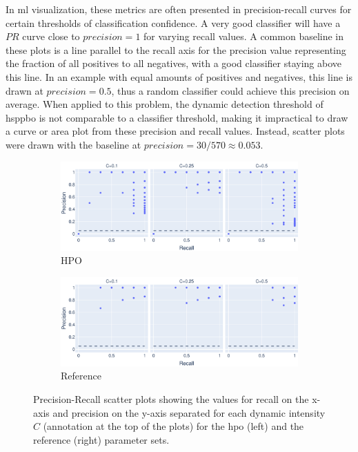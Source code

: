 In \gls{ml} visualization, these metrics are often presented in precision-recall curves for certain thresholds of classification confidence. A very good classifier will have a $PR$ curve close to $precision=1$ for varying recall values. A common baseline in these plots is a line parallel to the recall axis for the precision value representing the fraction of all positives to all negatives, with a good classifier staying above this line. In an example with equal amounts of positives and negatives, this line is drawn at $precision=0.5$, thus a random classifier could achieve this precision on average. When applied to this problem, the dynamic detection threshold of \gls{hsppbo} is not comparable to a classifier threshold, making it impractical to draw a curve or area plot from these precision and recall values. Instead, scatter plots were drawn with the baseline at $precision=30/570\approx0.053$. 

\begin{figure}[h]
	\centering
	\begin{subfigure}[b]{1\textwidth}
		\includegraphics[width=1\textwidth]{results/part3/pr_curve_cmp_dynamic_grouped_False_HPO.svg}
		\caption{HPO}
		\label{fig:pr_curve_cmp_dynamic_HPO}
	\end{subfigure}
	\hfill
	\begin{subfigure}[b]{1\textwidth}
		\includegraphics[width=1\textwidth]{results/part3/pr_curve_cmp_dynamic_grouped_False_Reference.svg}
		\caption{Reference}
		\label{fig:pr_curve_cmp_dynamic_Reference}
	\end{subfigure}
	\caption[Precision-Recall scatter plots separated by dynamic intensity $C$ for both parameter sets]{Precision-Recall scatter plots showing the values for recall on the x-axis and precision on the y-axis separated for each dynamic intensity $C$ (annotation at the top of the plots) for the \gls{hpo} (left) and the reference (right) parameter sets.}
	\label{fig:pr_curve_cmp_dynamic}
\end{figure}

